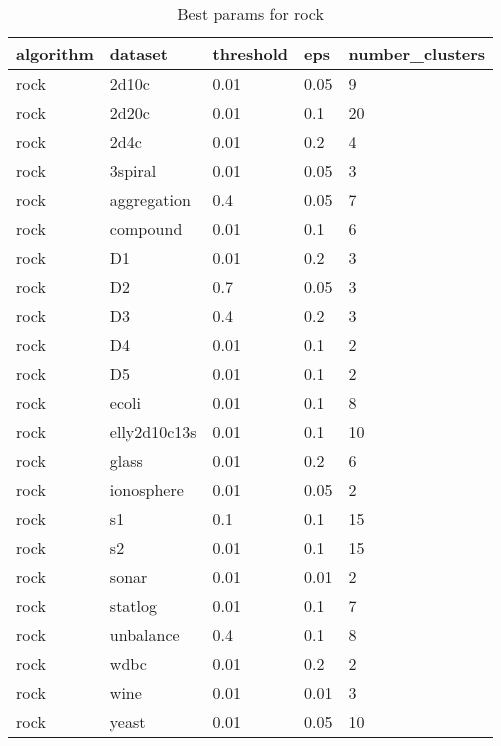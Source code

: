 \begin{table}[H]
\centering
\caption{Best params for rock}
\label{tab:params:rock}
\begin{tabular}{|l|l|l|l|l|}
\hline
algorithm & dataset & threshold & eps & number\_clusters \\
\hline
rock & 2d10c & 0.01 & 0.05 & 9 \\
\hline
rock & 2d20c & 0.01 & 0.1 & 20 \\
\hline
rock & 2d4c & 0.01 & 0.2 & 4 \\
\hline
rock & 3spiral & 0.01 & 0.05 & 3 \\
\hline
rock & aggregation & 0.4 & 0.05 & 7 \\
\hline
rock & compound & 0.01 & 0.1 & 6 \\
\hline
rock & D1 & 0.01 & 0.2 & 3 \\
\hline
rock & D2 & 0.7 & 0.05 & 3 \\
\hline
rock & D3 & 0.4 & 0.2 & 3 \\
\hline
rock & D4 & 0.01 & 0.1 & 2 \\
\hline
rock & D5 & 0.01 & 0.1 & 2 \\
\hline
rock & ecoli & 0.01 & 0.1 & 8 \\
\hline
rock & elly2d10c13s & 0.01 & 0.1 & 10 \\
\hline
rock & glass & 0.01 & 0.2 & 6 \\
\hline
rock & ionosphere & 0.01 & 0.05 & 2 \\
\hline
rock & s1 & 0.1 & 0.1 & 15 \\
\hline
rock & s2 & 0.01 & 0.1 & 15 \\
\hline
rock & sonar & 0.01 & 0.01 & 2 \\
\hline
rock & statlog & 0.01 & 0.1 & 7 \\
\hline
rock & unbalance & 0.4 & 0.1 & 8 \\
\hline
rock & wdbc & 0.01 & 0.2 & 2 \\
\hline
rock & wine & 0.01 & 0.01 & 3 \\
\hline
rock & yeast & 0.01 & 0.05 & 10 \\
\hline
\end{tabular}
\end{table}